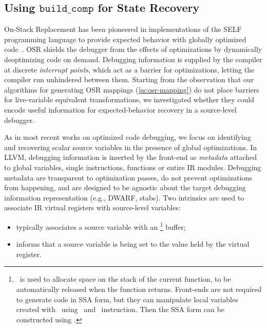 \subsection{Using \texorpdfstring{$\texttt{build\_comp}$}{build\_comp} for State Recovery}
On-Stack Replacement has been pioneered in implementations of the SELF programming language to provide expected behavior with globally optimized code~\cite{Holzle92}. OSR shields the debugger from the effects of optimizations by dynamically deoptimizing code on demand. Debugging information is supplied by the compiler at discrete {\em interrupt points}, which act as a barrier for optimizations, letting the compiler run unhindered between them. Starting from the observation that our algorithms for generating OSR mappings (\mysection\ref{ss:osr-mapping}) do not place barriers for live-variable equivalent transformations, we investigated whether they could encode useful information for expected-behavior recovery in a source-level debugger.

As in most recent works on optimized code debugging, we focus on identifying and recovering scalar source variables in the presence of global optimizations. In LLVM, debugging information is inserted by the front-end as {\em metadata} attached to global variables, single instructions, functions or entire IR modules. Debugging metadata are transparent to optimization passes, do not prevent optimizations from happening, and are designed to be agnostic about the target debugging information representation (e.g., DWARF, stabs). Two intrinsics are used to associate IR virtual registers with source-level variables:
\begin{itemize}[itemsep=0pt,parsep=3pt]
 \item {} typically associates a source variable with an \alloca\footnote{\alloca\ is used to allocate space on the stack of the current function, to be automatically released when the function returns. Front-ends are not required to generate code in SSA form, but they can manipulate local variables created with \alloca\ using \load\ and \store\ instruction. Then the SSA form can be constructed using \memtoreg.} buffer;
 \item {} informs that a source variable is being set to the value held by the virtual register.
\end{itemize}

